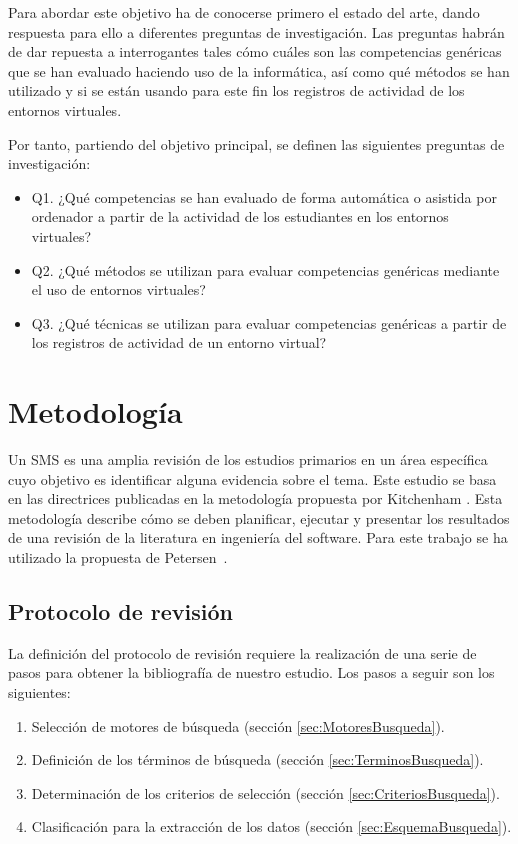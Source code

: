 Para abordar este objetivo ha de conocerse primero el estado del arte, dando respuesta para ello a diferentes preguntas de investigación. Las preguntas habrán de dar repuesta a interrogantes tales cómo cuáles son las competencias genéricas que se han evaluado haciendo uso de la informática, así como qué métodos se han utilizado y si se están usando para este fin los registros de actividad de los entornos virtuales.

\bigskip
Por tanto, partiendo del objetivo principal, se definen las siguientes preguntas de investigación:
\begin{itemize}
\item Q1. ¿Qué competencias se han evaluado de forma automática o asistida por ordenador a partir de la actividad de los estudiantes en los entornos virtuales?
\item Q2. ¿Qué métodos se utilizan para evaluar competencias genéricas mediante el uso de entornos virtuales?
\item Q3. ¿Qué técnicas se utilizan para evaluar competencias genéricas a partir de los registros de actividad de un entorno virtual?
\end{itemize}

\section{Metodología}

Un SMS es una amplia revisión de los estudios primarios en un área específica cuyo objetivo es identificar alguna evidencia sobre el tema. Este estudio se basa en las directrices publicadas en la metodología propuesta por Kitchenham \cite{Kitchenham:2010}. Esta metodología describe cómo se deben planificar, ejecutar y presentar los resultados de una revisión de la literatura en ingeniería del software. Para este trabajo se ha utilizado la propuesta de Petersen~\cite{Petersen:2008}.

\subsection{Protocolo de revisión}

La definición del protocolo de revisión requiere la realización de una serie de pasos para obtener la bibliografía de nuestro estudio. Los pasos a seguir son los siguientes:
\begin{enumerate}
\item Selección de motores de búsqueda (sección \ref{sec:MotoresBusqueda}).
\item Definición de los términos de búsqueda (sección \ref{sec:TerminosBusqueda}).
\item Determinación de los criterios de selección (sección \ref{sec:CriteriosBusqueda}).
\item Clasificación para la extracción de los datos (sección \ref{sec:EsquemaBusqueda}).
\end{enumerate}

